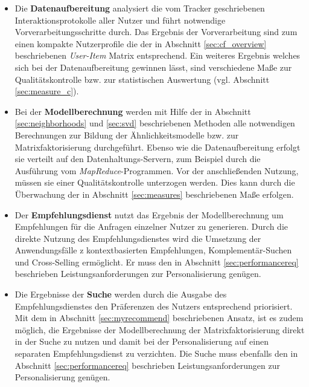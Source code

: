 \begin{itemize}
\item Die \textbf{Datenaufbereitung} analysiert die vom Tracker geschriebenen Interaktionsprotokolle aller Nutzer und führt notwendige Vorverarbeitungsschritte durch. Das Ergebnis der Vorverarbeitung sind zum einen kompakte Nutzerprofile die der in Abschnitt \ref{sec:cf_overview} beschriebenen \textit{User-Item} Matrix entsprechend. Ein weiteres Ergebnis welches sich bei der Datenaufbereitung gewinnen lässt, sind verschiedene Maße zur Qualitätskontrolle bzw. zur statistischen Auswertung (vgl. Abschnitt \ref{sec:measure_c}).
\item Bei der \textbf{Modellberechnung} werden mit Hilfe der in Abschnitt \ref{sec:neighborhoods} und \ref{sec:svd} beschriebenen Methoden alle notwendigen Berechnungen zur Bildung der Ähnlichkeitsmodelle bzw. zur Matrixfaktorisierung durchgeführt. Ebenso wie die Datenaufbereitung erfolgt sie verteilt auf den Datenhaltungs-Servern, zum Beispiel durch die Ausführung vom \textit{MapReduce}-Programmen. Vor der anschließenden Nutzung, müssen sie einer Qualitätskontrolle unterzogen werden. Dies kann durch die Überwachung der in Abschnitt \ref{sec:measures} beschriebenen Maße erfolgen.
\item Der \textbf{Empfehlungsdienst} nutzt das Ergebnis der Modellberechnung um Empfehlungen für die Anfragen einzelner Nutzer zu generieren. Durch die direkte Nutzung des Empfehlungsdienstes wird die Umsetzung der Anwendungsfälle z kontextbasierten Empfehlungen, Komplementär-Suchen und Cross-Selling ermöglicht. Er muss den in Abschnitt \ref{sec:performancereq} beschrieben Leistungsanforderungen zur Personalisierung genügen.
\item Die Ergebnisse der \textbf{Suche} werden durch die Ausgabe des Empfehlungsdienstes den Präferenzen des Nutzers entsprechend priorisiert. Mit dem in Abschnitt \ref{sec:myrecommend} beschriebenen Ansatz, ist es zudem möglich, die Ergebnisse der Modellberechnung der Matrixfaktorisierung direkt in der Suche zu nutzen und damit bei der Personalisierung auf einen separaten Empfehlungsdienst zu verzichten. Die Suche muss ebenfalls den in Abschnitt \ref{sec:performancereq} beschrieben Leistungsanforderungen zur Personalisierung genügen.
\end{itemize}